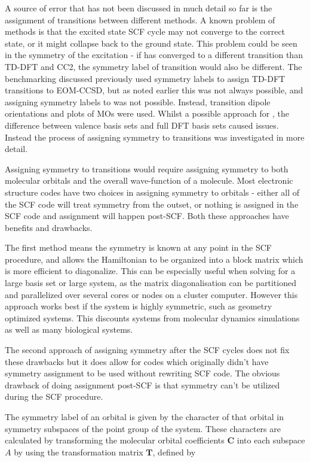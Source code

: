A source of error that has not been discussed in much detail so far is the assignment
of transitions between different methods. A known problem of \dscf methods is that
the excited state SCF cycle may not converge to the correct state, or it might
collapse back to the ground state. This problem could be seen in the symmetry of
the excitation - if \dscf has converged to a different transition than TD-DFT and 
CC2, the symmetry label of transition would also be different. The benchmarking
discussed previously used symmetry labels to assign TD-DFT transitions to EOM-CCSD, 
but as noted earlier this was not always possible, and assigning symmetry labels 
to \dscf was not possible. Instead, transition dipole orientations and plots of 
MOs were used. Whilst a possible approach for \dxtb, the difference between \dxtb 
valence basis sets and full DFT basis sets caused issues. Instead the process of
assigning symmetry to \dscf transitions was investigated in more detail.

Assigning symmetry to \dscf transitions would require assigning symmetry to both
molecular orbitals and the overall wave-function of a molecule. Most electronic 
structure codes have two choices in assigning symmetry to orbitals - either all
of the SCF code will treat symmetry from the outset, or nothing is assigned in the
SCF code and assignment will happen post-SCF. Both these approaches have benefits
and drawbacks.

The first method means the symmetry is known at any point in the SCF procedure,
and allows the Hamiltonian to be organized into a block matrix which is more efficient
to diagonalize. This can be especially useful when solving for a large basis set 
or large system, as the matrix diagonalisation can be partitioned and parallelized 
over several cores or nodes on a cluster computer. However this approach works best 
if the system is highly symmetric, such as geometry optimized systems. This discounts
systems from molecular dynamics simulations as well as many biological systems.

The second approach of assigning symmetry after the SCF cycles does not fix these
drawbacks but it does allow for codes which originally didn't have symmetry assignment
to be used without rewriting SCF code. The obvious drawback of doing assignment 
post-SCF is that symmetry can't be utilized during the SCF procedure.

The symmetry label of an orbital is given by the character of that orbital in symmetry
subspaces of the point group of the system. These characters are calculated by transforming
the molecular orbital coefficients $\mathbf{C}$ into each subspace $A$ by using
the transformation matrix $\mathbf{T}$, defined by

